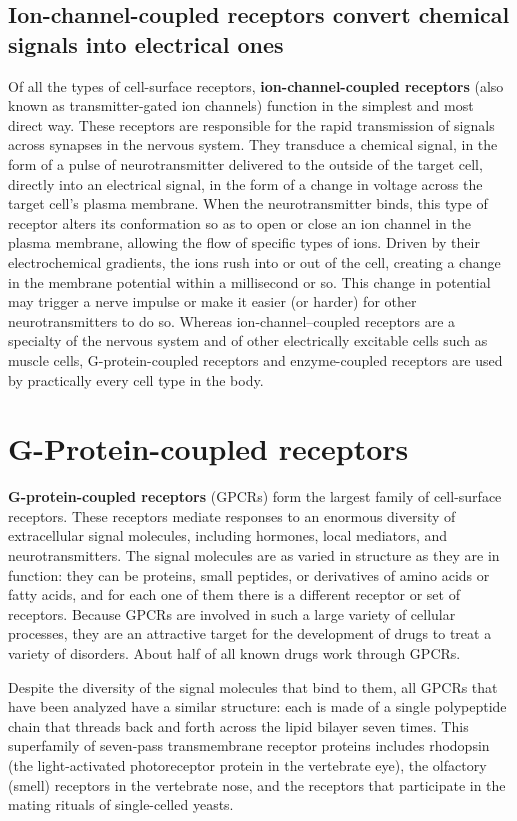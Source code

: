 \subsection{Ion-channel-coupled receptors convert chemical signals into electrical ones}

Of all the types of cell-surface receptors, \textbf{ion-channel-coupled receptors}
(also known as transmitter-gated ion channels) function in the
simplest and most direct way. These receptors are responsible for the
rapid transmission of signals across synapses in the nervous system.
They transduce a chemical signal, in the form of a pulse of neurotransmitter
delivered to the outside of the target cell, directly into an electrical
signal, in the form of a change in voltage across the target cell’s plasma
membrane. When the neurotransmitter binds, this type
of receptor alters its conformation so as to open or close an ion channel
in the plasma membrane, allowing the flow of specific types of ions.
Driven by their electrochemical gradients, the ions rush into or out of the cell,
creating a change in the membrane potential within a millisecond or so.
This change in potential may trigger a nerve impulse or make it easier
(or harder) for other neurotransmitters to do so.
Whereas ion-channel–coupled receptors are a specialty of the nervous
system and of other electrically excitable cells such as muscle cells,
G-protein-coupled receptors and enzyme-coupled receptors are used
by practically every cell type in the body.

\section{G-Protein-coupled receptors}

\textbf{G-protein-coupled receptors} (GPCRs) form the largest family of cell-surface
receptors. These receptors mediate responses to an enormous diversity of extracellular signal
molecules, including hormones, local mediators, and neurotransmitters.
The signal molecules are as varied in structure as they are in function:
they can be proteins, small peptides, or derivatives of amino acids or
fatty acids, and for each one of them there is a different receptor or set of
receptors. Because GPCRs are involved in such a large variety of cellular
processes, they are an attractive target for the development of drugs to
treat a variety of disorders. About half of all known drugs work through
GPCRs.

Despite the diversity of the signal molecules that bind to them, all GPCRs
that have been analyzed have a similar structure: each is made of a single
polypeptide chain that threads back and forth across the lipid bilayer
seven times. This superfamily of seven-pass transmembrane
receptor proteins includes rhodopsin (the light-activated photoreceptor
protein in the vertebrate eye), the olfactory (smell) receptors in the vertebrate
nose, and the receptors that participate in the mating rituals of
single-celled yeasts.


